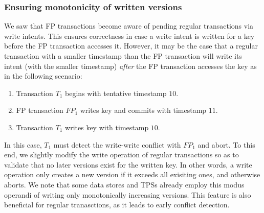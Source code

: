 \subsubsection{Ensuring monotonicity of written versions} \label{ssec:regular-client-alg}

We saw that FP transactions become aware of pending regular transactions via write intents. This ensures correctness
in case a write intent is written for a key before the FP transaction accesses it. However, it may be the
case that a regular transaction with a smaller timestamp than the FP transaction will write its intent (with 
the smaller timestamp) \emph{after} the FP transaction accesses the key as in the following scenario:
\begin{enumerate}
\item Transaction $T_1$ begins with tentative timestamp $10$.  
\item FP transaction $FP_1$ writes key and commits with timestamp $11$.  
\item Transaction $T_1$ writes key with timestamp $10$.  
\end{enumerate}
In this case, $T_1$ must detect the write-write conflict with $FP_1$ and abort.
To this end, we slightly modify the write operation of regular transactions so as to validate that no 
later versions exist for the written key. In other words, a write operation only creates a new version if it exceeds all
exisiting ones, and otherwise aborts.
We note that  some data stores and TPSs already employ this modus operandi of writing only monotonically increasing versions.
This feature is also beneficial for regular tranasctions, as it leads to early conflict detection.




